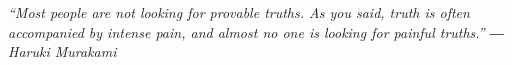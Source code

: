 \chapter*{}
\begin{center}
{\centering \it “Most people are not looking for provable truths. As you said, truth is often accompanied by intense pain, and almost no one is looking for painful truths.”
\newline 
― Haruki Murakami}
\end{center} 